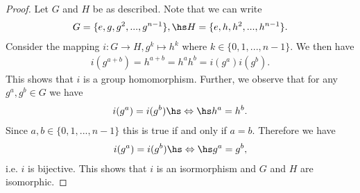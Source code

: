 \documentclass{article}
\begin{document}
\begin{proof}
    Let $G$ and $H$ be as described. Note that we can write
    \begin{align*}
        G=\{e, g, g^2, ..., g^{n-1}\},\hs
        H=\{e, h, h^2, ..., h^{n-1}\}.
    \end{align*}
    Consider the mapping $i:G\to H, g^k\mapsto h^k$ where
    $k\in\{0,1,...,n-1\}$. We then have
    \begin{align*}
        i(g^{a+b}) = h^{a+b} = h^a h^b = i(g^a)i(g^b).
    \end{align*}
    This shows that $i$ is a group homomorphism. Further, we observe
    that for any $g^a,g^b\in G$ we have
    \begin{align*}
        i(g^a) = i(g^b) \hs\Leftrightarrow\hs h^a=h^b.
    \end{align*}
    Since $a,b\in\{0,1,...,n-1\}$ this is true if and only if $a=b$.
    Therefore we have
    \begin{align*}
        i(g^a) = i(g^b) \hs\Leftrightarrow\hs g^a = g^b,
    \end{align*}
    i.e. $i$ is bijective. This shows that $i$ is an isormorphism
    and $G$ and $H$ are isomorphic.
\end{proof}
\end{document}
